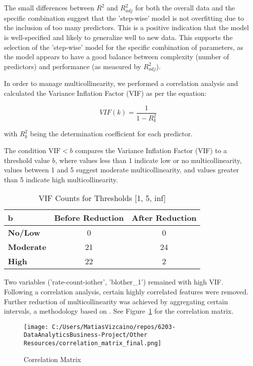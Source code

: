 \documentclass{article}
\begin{document}
The small differences between \(R^2\) and \(R^2_{adj}\) for both the overall data and the specific combination suggest that the 'step-wise' model is not overfitting due to the inclusion of too many predictors. This is a positive indication that the model is well-specified and likely to generalize well to new data. This supports the selection of the 'step-wise' model for the specific combination of parameters, as the model appears to have a good balance between complexity (number of predictors) and performance (as measured by \(R^2_{adj}\)).

In order to manage multicollinearity, we performed a correlation analysis and calculated the Variance Inflation Factor (VIF) as per the equation:

\begin{equation}
  VIF(k) = \frac{1}{1 - R^2_k}
\end{equation}

with $R^2_k$ being the determination coefficient for each predictor.

The condition \( \text{VIF} < b \) compares the Variance Inflation Factor (VIF) to a threshold value \( b \), where values less than 1 indicate low or no multicollinearity, values between 1 and 5 suggest moderate multicollinearity, and values greater than 5 indicate high multicollinearity.

\begin{table}[h]
\centering
\begin{tabular}{lcc}
\hline
 b & \textbf{Before Reduction} & \textbf{After Reduction} \\
\hline
\textbf{No/Low} & 0 & 0 \\
\textbf{Moderate} & 21 & 24 \\
\textbf{High} & 22 & 2 \\
\hline
\end{tabular}
\caption{VIF Counts for Thresholds [1, 5, inf]}
\end{table}

Two variables ('rate-count-iother', 'blother\_1') remained with high VIF. Following a correlation analysis, certain highly correlated features were removed. Further reduction of multicollinearity was achieved by aggregating certain intervals, a methodology based on \cite{Miori2023}. See Figure~\ref{fig:correlation-matrix} for the correlation matrix.

\begin{figure}[htbp]
  \centering
  \texttt{[image: C:/Users/MatiasVizcaino/repos/6203-DataAnalyticsBusiness-Project/Other Resources/correlation\_matrix\_final.png]}
  \caption{Correlation Matrix}
  \label{fig:correlation-matrix}
\end{figure}
\end{document}
